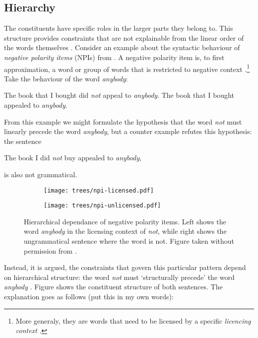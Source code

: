 \subsection{Hierarchy}
The constituents have specific roles in the larger parts they belong to. This structure provides constraints that are not explainable from the linear order of the words themselves \citep{everaert2015structures}. Consider an example about the syntactic behaviour of \textit{negative polarity items} (NPIs) from \citet{everaert2015structures}. A negative polarity item is, to first approximation, a word or group of words that is restricted to negative context \citep{everaert2015structures}.\footnote{More generaly, they are words that need to be licensed by a specific \textit{licencing context} \citep{giannakidou2011npi}.} Take the behaviour of the word \textit{anybody}:
\begin{exe}
  \ex \begin{xlist}
    \ex The book that I bought did \textit{not} appeal to \textit{anybody}.
    \ex *The book that I bought appealed to \textit{anybody}.
  \end{xlist}
\end{exe}
From this example we might formulate the hypothesis that the word \textit{not} must linearly precede the word \textit{anybody}, but a counter example refutes this hypothesis: the sentence
\begin{exe}
  \ex *The book I did \textit{not} buy appealed to \textit{anybody},
\end{exe}
is also not grammatical.
\begin{figure}[h]
  \begin{subfigure}[b]{0.5\textwidth}
		\texttt{[image: trees/npi-licensed.pdf]}
	\end{subfigure}
	\begin{subfigure}[b]{0.5\textwidth}
		\texttt{[image: trees/npi-unlicensed.pdf]}
	\end{subfigure}
\caption{Hierarchical dependance of negative polarity items. Left shows the word \textit{anybody} in the licensing context of \textit{not}, while right shows the ungrammatical sentence where the word is not. Figure taken without permission from \cite{everaert2015structures}.}
\label{fig:trees-npi}
\end{figure}
Instead, it is argued, the constraints that govern this particular pattern depend on hierarchical structure: the word \textit{not} must `structurally precede' the word \textit{anybody} \citep{everaert2015structures}. Figure \label{ref:trees-npi} shows the constituent structure of both sentences. The explanation goes as follows (put this in my own words): 



